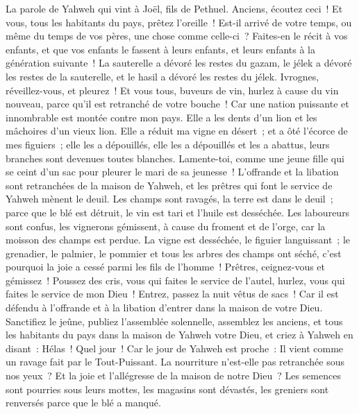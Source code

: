 \begin{multicols}{2}
\VerseOne{}La parole de Yahweh qui vint à Joël, fils de Pethuel.
Anciens, écoutez ceci~! Et vous, tous les habitants du pays, prêtez l'oreille~! Est-il arrivé de votre temps, ou même du temps de vos pères, une chose comme celle-ci~?
Faites-en le récit à vos enfants, et que vos enfants le fassent à leurs enfants, et leurs enfants à la génération suivante~!
La sauterelle a dévoré les restes du gazam, le jélek a dévoré les restes de la sauterelle, et le hasil a dévoré les restes du jélek.
Ivrognes, réveillez-vous, et pleurez~! Et vous tous, buveurs de vin, hurlez à cause du vin nouveau, parce qu'il est retranché de votre bouche~!
Car une nation puissante et innombrable est montée contre mon pays. Elle a les dents d'un lion et les mâchoires d'un vieux lion.
Elle a réduit ma vigne en désert~; et a ôté l'écorce de mes figuiers~; elle les a dépouillés, elle les a dépouillés et les a abattus, leurs branches sont devenues toutes blanches.
Lamente-toi, comme une jeune fille qui se ceint d'un sac pour pleurer le mari de sa jeunesse~!
L'offrande et la libation sont retranchées de la maison de Yahweh, et les prêtres qui font le service de Yahweh mènent le deuil.
Les champs sont ravagés, la terre est dans le deuil~; parce que le blé est détruit, le vin est tari et l'huile est desséchée.
Les laboureurs sont confus, les vignerons gémissent, à cause du froment et de l'orge, car la moisson des champs est perdue.
La vigne est desséchée, le figuier languissant~; le grenadier, le palmier, le pommier et tous les arbres des champs ont séché, c'est pourquoi la joie a cessé parmi les fils de l'homme~!
Prêtres, ceignez-vous et gémissez~! Poussez des cris, vous qui faites le service de l'autel, hurlez, vous qui faites le service de mon Dieu~! Entrez, passez la nuit vêtus de sacs~! Car il est défendu à l'offrande et à la libation d'entrer dans la maison de votre Dieu.
Sanctifiez le jeûne, publiez l'assemblée solennelle, assemblez les anciens, et tous les habitants du pays dans la maison de Yahweh votre Dieu, et criez à Yahweh en disant~:
Hélas~! Quel jour~! Car le jour de Yahweh est proche~: Il vient comme un ravage fait par le Tout-Puissant.
La nourriture n'est-elle pas retranchée sous nos yeux~? Et la joie et l'allégresse de la maison de notre Dieu~?
Les semences sont pourries sous leurs mottes, les magasins sont dévastés, les greniers sont renversés parce que le blé a manqué.

\end{multicols}
